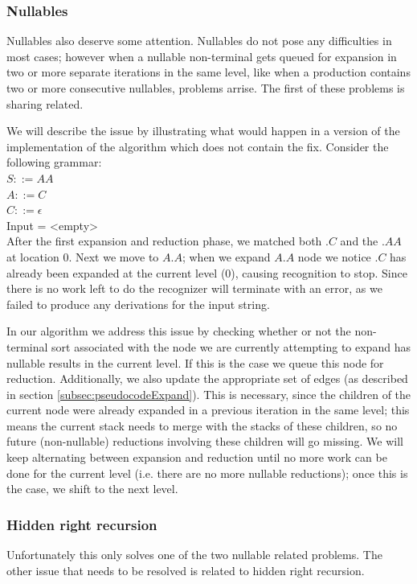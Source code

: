 \documentclass[a4paper,10pt]{article}
\begin{document}
\subsubsection{Nullables}
\label{subsec:nullables}
Nullables also deserve some attention. Nullables do not pose any difficulties in most cases; however when a nullable non-terminal gets queued for expansion in two or more separate iterations in the same level, like when a production contains two or more consecutive nullables, problems arrise. The first of these problems is sharing related.

We will describe the issue by illustrating what would happen in a version of the implementation of the algorithm which does not contain the fix.
Consider the following grammar:\\
$S ::= AA$\\
$A ::= C$\\
$C ::= \epsilon$\\
Input = <empty>\\
After the first expansion and reduction phase, we matched both $.C$ and the $.AA$ at location $0$. Next we move to $A.A$; when we expand $A.A$ node we notice $.C$ has already been expanded at the current level ($0$), causing recognition to stop. Since there is no work left to do the recognizer will terminate with an error, as we failed to produce any derivations for the input string.

In our algorithm we address this issue by checking whether or not the non-terminal sort associated with the node we are currently attempting to expand has nullable results in the current level. If this is the case we queue this node for reduction. Additionally, we also update the appropriate set of edges (as described in section \ref{subsec:pseudocodeExpand}). This is necessary, since the children of the current node were already expanded in a previous iteration in the same level; this means the current stack needs to merge with the stacks of these children, so no future (non-nullable) reductions involving these children will go missing. We will keep alternating between expansion and reduction until no more work can be done for the current level (i.e. there are no more nullable reductions); once this is the case, we shift to the next level.

\subsubsection{Hidden right recursion}
\label{subsec:hiddenRightRecursion}
Unfortunately this only solves one of the two nullable related problems. The other issue that needs to be resolved is related to hidden right recursion.
\end{document}
